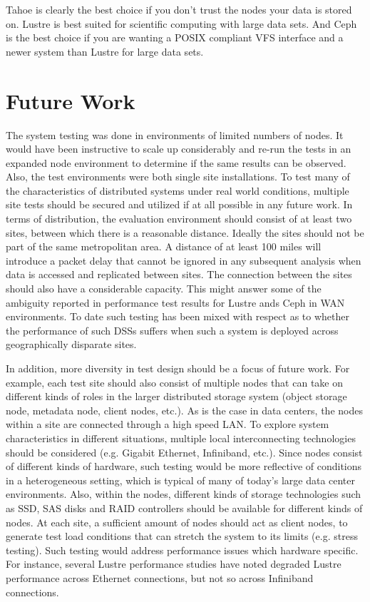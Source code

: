 \documentclass[11pt]{article}
\begin{document}
Tahoe is clearly the best choice if you don't trust the nodes your data is stored on. Lustre is best suited for scientific computing with large data sets. And Ceph is the best choice if you are wanting a POSIX compliant VFS interface and a newer system than Lustre for large data sets. 

\section{Future Work}

The system testing was done in environments of limited numbers of 
nodes. It would have been instructive to scale up considerably and 
re-run the tests in an expanded node environment to determine if 
the same results can be observed. Also, the test environments were 
both single site installations. To test many of the characteristics 
of distributed systems under real world conditions, multiple site 
tests should be secured and utilized if at all possible in any future 
work. In terms of distribution, the evaluation environment should 
consist of at least two sites, between which there is a reasonable 
distance. Ideally the sites should not be part of the same 
metropolitan area. A distance of at least 100 miles will introduce 
a packet delay that cannot be ignored in any subsequent analysis when
data is accessed and replicated between sites. The connection between 
the sites should also have a considerable capacity. This might answer 
some of the ambiguity reported in performance test results for Lustre 
ands Ceph in WAN environments. To date such testing has been mixed with 
respect as to whether the performance of such DSSs suffers when such a 
system is deployed across geographically disparate sites. 

In addition, more diversity in test design should be a focus of future 
work. For example, each test site should also consist of multiple nodes 
that can take on different kinds of roles in the larger distributed 
storage system (object storage node, metadata node, client nodes, etc.). 
As is the case in data centers, the nodes within a site are connected 
through a high speed LAN. To explore system characteristics in different 
situations, multiple local interconnecting technologies should be 
considered (e.g. Gigabit Ethernet, Infiniband, etc.). Since nodes 
consist of different kinds of hardware, such testing would be more 
reflective of conditions in a heterogeneous setting, which is typical 
of many of today’s large data center environments. Also, within the 
nodes, different kinds of storage technologies such as SSD, SAS disks 
and RAID controllers should be available for different kinds of nodes. 
At each site, a sufficient amount of nodes should act as client nodes, 
to generate test load conditions that can stretch the system to its 
limits (e.g. stress testing). Such testing would address performance 
issues which hardware specific. For instance, several Lustre performance 
studies have noted degraded Lustre performance across Ethernet connections,
but not so across Infiniband connections.
\end{document}
